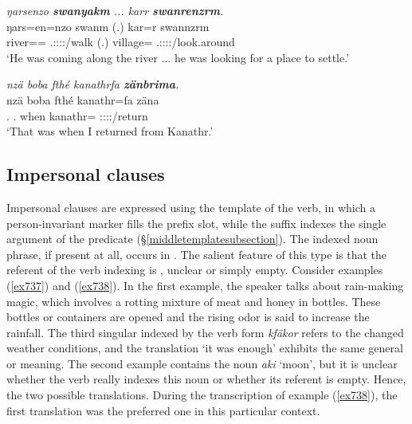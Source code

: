\begin{exe}
	\ex \emph{ŋarsenzo \textbf{swanyakm} ... karr \textbf{swanrenzrm}.}\\
	\gll ŋars=en=nzo swanm (.) kar=r swannzrm\\
	river=\Loc={\Only} \Tsg.\Masc:\Sbj:\Pst:\Dur:\Venit/walk (.) village={\Purp} \Tsg.\Masc:\Sbj:\Pst:\Dur:\Venit/look.around\\
	\trans `He was coming along the river ... he was looking for a place to settle.'\\
	\label{ex562}
\end{exe}
\begin{exe}
	\ex \emph{nzä boba fthé kanathrfa \textbf{zänbrima}.}\\
	\gll nzä boba fthé kanathr=fa zäna\\
	\Fsg.{\Abs} \Med.{\Abl} when kanathr={\Abl} \Sg:\Sbj:\Pst:\Pfv:\Venit/return\\
	\trans `That was when I returned from Kanathr.'
	\label{ex563}
\end{exe}

\subsection{Impersonal clauses}\label{impersonalclause}

Impersonal clauses are expressed using the  template of the verb, in which a person-invariant  marker fills the prefix slot, while the suffix indexes the single argument of the predicate ({\S}\ref{middletemplatesubsection}). The indexed noun phrase, if present at all, occurs in  . The salient feature of this  type is that the referent of the verb indexing is , unclear or simply empty. Consider examples (\ref{ex737}) and (\ref{ex738}). In the first example, the speaker talks about rain-making magic, which involves a rotting mixture of meat and honey in bottles. These bottles or containers are opened and the rising odor is said to increase the rainfall. The third singular indexed by the verb form \emph{kfäkor} refers to the changed weather conditions, and the  translation `it was enough' exhibits the same general or  meaning. The second example contains the noun \emph{aki} `moon', but it is unclear whether the verb really indexes this noun or whether its referent is empty. Hence, the two possible translations. During the transcription of example (\ref{ex738}), the first translation was the preferred one in this particular context.

